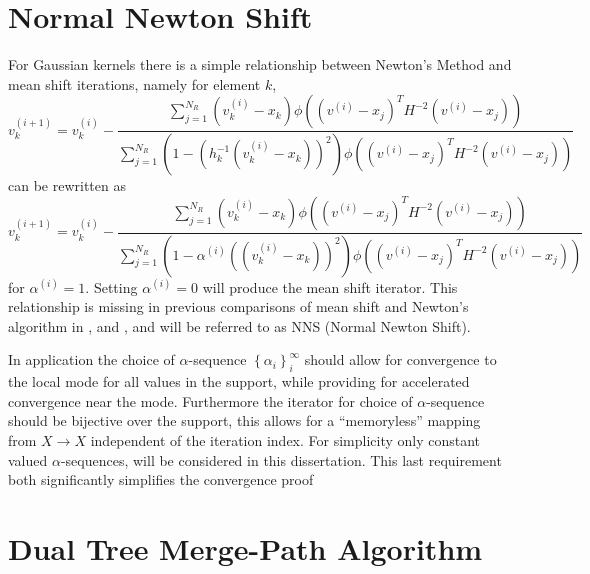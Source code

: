 \documentclass[10pt,oneside]{article}
\begin{document}
\maketitle

\section{Normal Newton Shift}

For Gaussian kernels there is a simple relationship between Newton's Method and mean shift iterations, namely for element $k$,
\begin{equation} 
  v_k^{(i+1)} = v_k^{(i)} - \frac{ 
    \sum_{j=1}^{N_R } (v_k^{(i)} - x_k) \phi \left( 
    \left( v^{(i)} - x_j\right)^T H^{-2} \left( v^{(i)} - x_j\right)
    \right)
  } {
    \sum_{j=1}^{N_R } \left( 1 - \left( h_k^{-1}(v_k^{(i)} - x_k) \right)^2 \right) \phi \left( 
    \left( v^{(i)} - x_j\right)^T H^{-2} \left( v^{(i)} - x_j\right) 
    \right)
  } 
\end{equation}
can be rewritten as 
\begin{equation} 
  v_k^{(i+1)} = v_k^{(i)} - \frac{ 
    \sum_{j=1}^{N_R } (v_k^{(i)} - x_k) \phi \left( 
    \left( v^{(i)} - x_j\right)^T H^{-2} \left( v^{(i)} - x_j\right) 
    \right)
  } {
    \sum_{j=1}^{N_R } \left( 1 - \alpha^{(i)} 
    \left( (v_k^{(i)} - x_k) \right)^2 \right) 
    \phi \left( \left( v^{(i)} - x_j\right)^T H^{-2} \left( v^{(i)} - x_j\right) \right)
  } 
\end{equation} 
for $\alpha^{(i)} =1$.
Setting $\alpha^{(i)}=0$  will produce the mean shift iterator.
This relationship is missing in previous comparisons of mean shift and Newton's algorithm in \cite{chiu2008dual}, \cite{fashing2005mean} and \cite{yang2003mean}, and 
 will be referred to as NNS (Normal Newton Shift).
 
In application the choice of $\alpha$-sequence $\left\{\alpha_i\right\}_i^{\infty}$ should allow for convergence to the local mode for all values in the support, while providing for accelerated convergence near the mode. 
Furthermore the iterator for choice of $\alpha$-sequence should be bijective over the support, this allows for a ``memoryless'' mapping from $X \to X$ independent of the iteration index.
For simplicity only constant valued $\alpha$-sequences, will be considered in this dissertation.
This last requirement both significantly simplifies the convergence proof 

\section{Dual Tree Merge-Path Algorithm}
\label{para:DualTreeMergePath}
\end{document}
